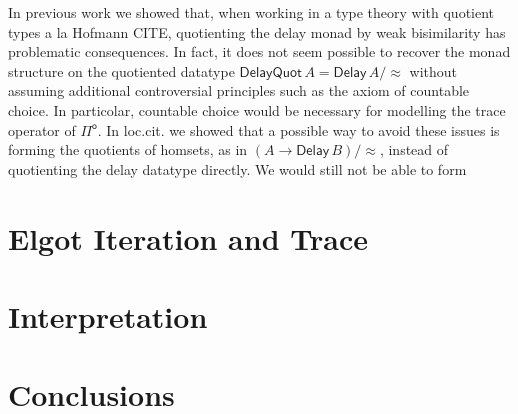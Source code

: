 \documentclass[runningheads]{llncs}
\newcommand{\Pio}{$\Pi^{\mathsf{o}}$}
\newcommand{\Delay}{\mathsf{Delay}\,}
\begin{document}
In previous work \cite{ChapmanUV19} we showed that, when working in a
type theory with quotient types a la Hofmann CITE, quotienting the
delay monad by weak bisimilarity has problematic consequences. In
fact, it does not seem possible to recover the monad structure on the
quotiented datatype $\mathsf{DelayQuot}\,A = \Delay A/{\approx}$
without assuming additional controversial principles
such as the axiom of countable choice. In particolar, countable choice
would be necessary for modelling the trace operator of \Pio. In
loc.cit. we showed that a possible way to avoid these issues is
forming the quotients of homsets, as in $(A \to \Delay B)/{\approx}$, instead of
quotienting the delay datatype directly. We would still not be able to form




\section{Elgot Iteration and Trace}\label{sec:elgot}

\section{Interpretation}\label{sec:interpretation}

\section{Conclusions}


%
%
%
%
%
%


\end{document}
